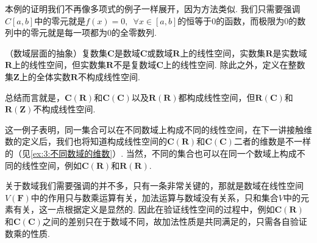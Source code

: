 本例的证明我们不再像多项式的例子一样展开，因为方法类似. 我们只需要强调$C[a,b]$中的零元就是$f(x)=0,\enspace\forall x\in[a,b]$的恒等于$0$的函数，而极限为0的数列中的零元就是每一项都为$0$的全零数列.

\begin{example}
    （数域层面的抽象）复数集$\mathbf{C}$是数域$\mathbf{C}$或数域$\mathbf{R}$上的线性空间，实数集$\mathbf{R}$是实数域$\mathbf{R}$上的线性空间，但实数集$\mathbf{R}$不是复数域$\mathbf{C}$上的线性空间. 除此之外，定义在整数集$\mathbf{Z}$上的全体实数$\mathbf{R}$不构成线性空间.

    总结而言就是，$\mathbf{C}(\mathbf{R})$和$\mathbf{C}(\mathbf{C})$以及$\mathbf{R(R)}$都构成线性空间，但$\mathbf{R}(\mathbf{C})$和$\mathbf{R}(\mathbf{Z})$不构成线性空间.
\end{example}

这一例子表明，同一集合可以在不同数域上构成不同的线性空间，在下一讲接触维数的定义后，我们也将知道构成线性空间的$\mathbf{C}(\mathbf{R})$和$\mathbf{C}(\mathbf{C})$二者的维数是不一样的（见\autoref{ex:3:不同数域的维数}）. 当然，不同的集合也可以在同一个数域上构成不同的线性空间，例如$\mathbf{C(R)}$和$\mathbf{R(R)}$.

关于数域我们需要强调的并不多，只有一条非常关键的，那就是数域在线性空间$V(\mathbf{F})$中的作用只与数乘运算有关，加法运算与数域没有关系，只和集合$V$中的元素有关，这一点根据定义是显然的. 因此在验证线性空间的过程中，例如$\mathbf{C}(\mathbf{R})$和$\mathbf{C}(\mathbf{C})$之间的差别只在于数域不同，故加法性质是共同满足的，只需各自验证数乘的性质.

